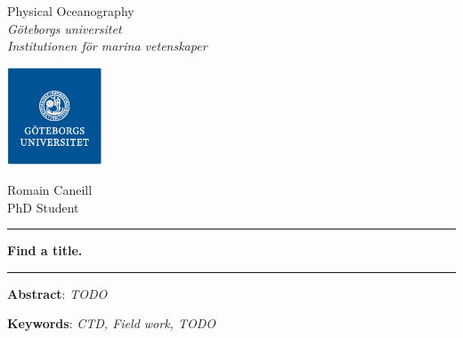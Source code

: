 \documentclass[12pt,a4paper]{article}
\begin{document}
\setlength{\parindent}{0pt}

\thispagestyle{empty}

\begin{minipage}{0.4\paperwidth}
  {\sc Physical Oceanography} \\
{\it Göteborgs universitet}\\
{\it Institutionen för marina vetenskaper}
\end{minipage}
\begin{minipage}{0.3\paperwidth}
  \includegraphics[height=2.9cm]{gu}
\end{minipage}
\begin{minipage}{0.2\paperwidth}
  Romain Caneill\\
  PhD Student
\end{minipage}

\begin{center}
\vspace{.3cm}

\rule[5pt]{10cm}{0.5pt}
\vspace{10pt}

\textbf{\Large Find a title.}
\vspace{8pt}

\rule{10cm}{0.5pt}

\vspace{.3cm}

\parbox{15cm}{\small
\textbf{Abstract}: \it TODO
} %

\vspace{0.5cm}

\parbox{15cm}{
\textbf{Keywords}: \it CTD, Field work, TODO
} %

\end{center}

\newpage

\setcounter{page}{1}
\setlength\parindent{24pt}

\newpage

\tableofcontents
\end{document}
